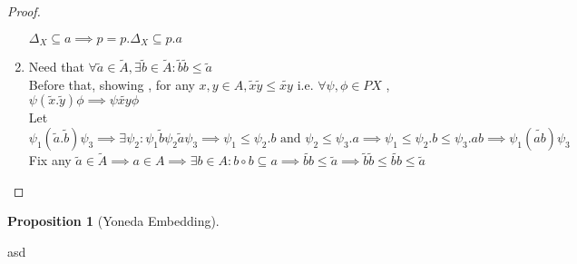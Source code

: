 \documentclass[18pt,a4paper]{article}
\theoremstyle{definition}
\newtheorem{proop}{Proposition}[section]
\begin{document}
\begin{proof}
\begin{enumerate}[label=(\roman*)]
		$\Delta_X \subseteq a \implies p=p.\Delta_X \subseteq p.a$
	\item Need that $\forall \tilde{a} \in \tilde{A} , \exists \tilde{b}\in \tilde{A}:
		\tilde{b}\tilde{b} \leq \tilde{a} $\\
		Before that, showing , for any $x,y \in A, \tilde{x} \tilde{y} \leq \widetilde{xy} $
		i.e. $\forall \psi, \phi \in PX$ , $\psi(\tilde{x}.\tilde{y})\phi \implies
		\psi \widetilde{xy} \phi $\\
		Let $\psi_1(\tilde{a} .\tilde{b} )\psi_3 \implies \exists \psi_2:
		\psi_1 \tilde{b} \psi_2 \tilde{a} \psi_3 \implies
		\psi_1 \leq \psi_2.b \text{ and } \psi_2 \leq \psi_3.a
		\implies \psi_1 \leq \psi_2.b \leq \psi_3.ab \implies \psi_1(\widetilde{ab})\psi_3$
		\\
		Fix any $\tilde{a}\in \tilde{A} \implies a\in A \implies \exists b \in A: b \circ b \subseteq
		a \implies \widetilde{bb} \leq \tilde{a} \implies \tilde{b} \tilde{b} \leq
		\widetilde{bb} \leq \tilde{a}  $

\end{enumerate}
\end{proof}

\begin{proop}[Yoneda Embedding]

\end{proop}






\newpage
asd
\end{document}
